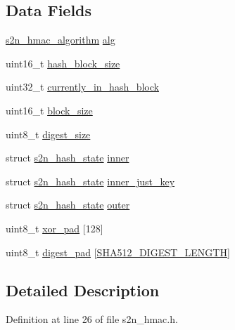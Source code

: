 \subsection*{Data Fields}
\begin{DoxyCompactItemize}
\item 
\hyperlink{s2n__hmac_8h_a05e34c658a0066b52f746b931d53dbf8}{s2n\+\_\+hmac\+\_\+algorithm} \hyperlink{structs2n__hmac__state_ae2daecd156006e6cf5c5800a7293628c}{alg}
\item 
uint16\+\_\+t \hyperlink{structs2n__hmac__state_aca61390fa10dd3f3eb4badb02b7fbffe}{hash\+\_\+block\+\_\+size}
\item 
uint32\+\_\+t \hyperlink{structs2n__hmac__state_a492cc04284ac35744b5e60cf027bf54c}{currently\+\_\+in\+\_\+hash\+\_\+block}
\item 
uint16\+\_\+t \hyperlink{structs2n__hmac__state_a9d83aa5f365f4a1b62dd70bd1ae426a3}{block\+\_\+size}
\item 
uint8\+\_\+t \hyperlink{structs2n__hmac__state_a1095510d3cd778f68d04742971c79b5b}{digest\+\_\+size}
\item 
struct \hyperlink{structs2n__hash__state}{s2n\+\_\+hash\+\_\+state} \hyperlink{structs2n__hmac__state_aaa037d7ea69f079ef9413e71714fc357}{inner}
\item 
struct \hyperlink{structs2n__hash__state}{s2n\+\_\+hash\+\_\+state} \hyperlink{structs2n__hmac__state_afeeaec16595d282576d3b90608ffe94f}{inner\+\_\+just\+\_\+key}
\item 
struct \hyperlink{structs2n__hash__state}{s2n\+\_\+hash\+\_\+state} \hyperlink{structs2n__hmac__state_a7d8607ae48bf17ec01bd5b4cfb9ace66}{outer}
\item 
uint8\+\_\+t \hyperlink{structs2n__hmac__state_a2f89765d4eb1f17131d29980f2a2c9d5}{xor\+\_\+pad} \mbox{[}128\mbox{]}
\item 
uint8\+\_\+t \hyperlink{structs2n__hmac__state_a5307db56761519da1750d395331d8e90}{digest\+\_\+pad} \mbox{[}\hyperlink{include_2openssl_2sha_8h_a5a8416d0f8e1af6d7525114ef09be118}{S\+H\+A512\+\_\+\+D\+I\+G\+E\+S\+T\+\_\+\+L\+E\+N\+G\+TH}\mbox{]}
\end{DoxyCompactItemize}


\subsection{Detailed Description}


Definition at line 26 of file s2n\+\_\+hmac.\+h.



